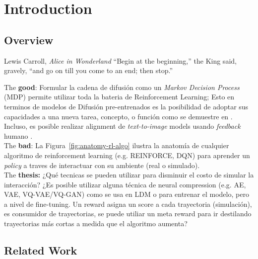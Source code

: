 \chapter{Introduction}

\section{Overview}

\begin{chapquote}{Lewis Carroll, \textit{Alice in Wonderland}}
``Begin at the beginning,'' the King said, gravely, ``and go on till you come to an end; then stop.''
\end{chapquote}


The \textbf{good}: Formular la cadena de difusión como un \textit{Markov Decision Process} (MDP) permite utilizar toda la bateria de Reinforcement Learning; Esto en terminos de modelos de Difusión pre-entrenados es la posibilidad de adoptar sus capacidades a una nueva tarea, concepto, o función como se demuestre en \cite{black2023training}. Incluso, es posible realizar alignment de \textit{text-to-image} models usando \textit{feedback} humano \cite{ouyang2022training}. \\

The \textbf{bad}: La Figura~\ref{fig:anatomy-rl-algo} ilustra la anatomía de cualquier algoritmo de reinforcement learning (e.g. REINFORCE, DQN) para aprender un \textit{policy} a traves de interactuar con su ambiente (real o simulado). \\

The \textbf{thesis:} ¿Qué tecnicas se pueden utilizar para disminuir el costo de simular la interacción? ¿Es posible utilizar alguna técnica de neural compression (e.g. AE, VAE, VQ-VAE/VQ-GAN) como se usa en LDM \cite{rombach2022highresolution} o \cite{pernias2023wuerstchen} para entrenar el modelo, pero a nivel de fine-tuning. Un reward asigna un score a cada trayectoria (simulación), es consumidor de trayectorias, se puede utiliar un meta reward para ir destilando trayectorias más cortas a medida que el algoritmo aumenta? \\


\section{Related Work}

